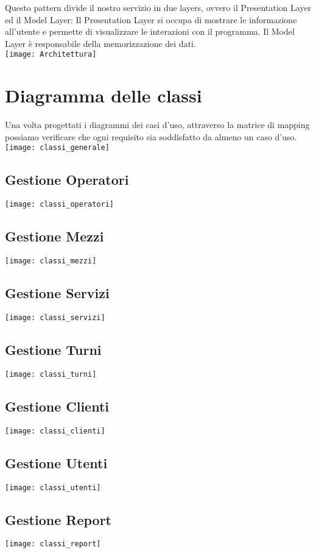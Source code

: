 \documentclass[green, fancy, 11pt]{elegantbook}
\begin{document}
Questo pattern divide il nostro servizio in due layers, ovvero il Presentation Layer ed il Model Layer:
Il Presentation Layer si occupa di mostrare le informazione all'utente e permette di visualizzare le interazioni con il programma.
Il Model Layer è responsabile della memorizzazione dei dati.
\\
\texttt{[image: Architettura]}

\newpage
\section{Diagramma delle classi}
Una volta progettati i diagrammi dei casi d'uso, attraverso la matrice di mapping possiamo verificare che ogni requisito sia soddisfatto da almeno un caso d'uso.
\\
\noindent \texttt{[image: classi\_generale]}
\newpage

\subsection{Gestione Operatori}
\noindent \texttt{[image: classi\_operatori]}
\subsection{Gestione Mezzi}
\noindent \texttt{[image: classi\_mezzi]}
\newpage

\subsection{Gestione Servizi}
\noindent \texttt{[image: classi\_servizi]}
\subsection{Gestione Turni}
\noindent \texttt{[image: classi\_turni]}
\newpage

\subsection{Gestione Clienti}
\noindent \texttt{[image: classi\_clienti]}
\subsection{Gestione Utenti}
\noindent \texttt{[image: classi\_utenti]}
\newpage

\subsection{Gestione Report}
\noindent \texttt{[image: classi\_report]}
\newpage
\end{document}
